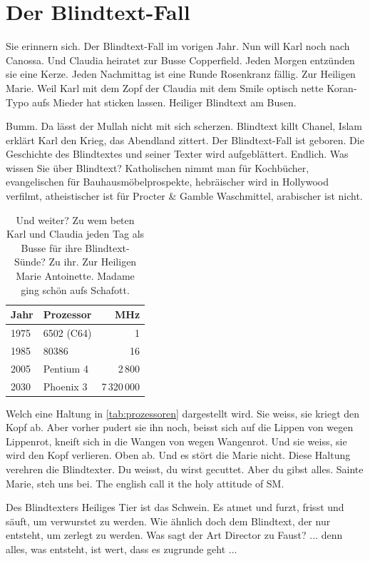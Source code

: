 \documentclass{scrartcl}
\begin{document}
  \section{Der Blindtext-Fall}

  Sie erinnern sich. Der Blindtext-Fall im vorigen Jahr. Nun will Karl noch nach Canossa. Und Claudia heiratet zur Busse Copperfield. Jeden Morgen entzünden sie eine Kerze. Jeden Nachmittag ist eine Runde Rosenkranz fällig. Zur Heiligen Marie. Weil Karl mit dem Zopf der Claudia mit dem Smile optisch nette Koran-Typo aufs Mieder hat sticken lassen. Heiliger Blindtext am Busen.

  Bumm. Da lässt der Mullah nicht mit sich scherzen. Blindtext killt Chanel, Islam erklärt Karl den Krieg, das Abendland zittert. Der Blindtext-Fall ist geboren. Die Geschichte des Blindtextes und seiner Texter wird aufgeblättert. Endlich. Was wissen Sie über Blindtext? Katholischen nimmt man für Kochbücher, evangelischen für Bauhausmöbelprospekte, hebräischer wird in Hollywood verfilmt, atheistischer ist für Procter \& Gamble Waschmittel, arabischer ist nicht.

  \begin{table}
    \centering
    \begin{tabular}{l|lr}
      \textbf{Jahr} & \textbf{Prozessor} & \textbf{MHz} \\ \hline
      1975 & 6502 (C64) & 1 \\
      1985 & 80386 & 16 \\
      2005 & Pentium 4 & 2\,800 \\
      2030 & Phoenix 3 & 7\,320\,000
    \end{tabular}
    \caption{Und weiter? Zu wem beten Karl und Claudia jeden Tag als Busse für ihre Blindtext-Sünde? Zu ihr. Zur Heiligen Marie Antoinette. Madame ging schön aufs Schafott.}
    \label{tab:prozessoren}
  \end{table}

  Welch eine Haltung in \autoref{tab:prozessoren} dargestellt wird. Sie weiss, sie kriegt den Kopf ab. Aber vorher pudert sie ihn noch, beisst sich auf die Lippen von wegen Lippenrot, kneift sich in die Wangen von wegen Wangenrot. Und sie weiss, sie wird den Kopf verlieren. Oben ab. Und es stört die Marie nicht. Diese Haltung verehren die Blindtexter. Du weisst, du wirst gecuttet. Aber du gibst alles. Sainte Marie, steh uns bei. The english call it the holy attitude of SM.

  Des Blindtexters Heiliges Tier ist das Schwein. Es atmet und furzt, frisst und säuft, um verwurstet zu werden. Wie ähnlich doch dem Blindtext, der nur entsteht, um zerlegt zu werden. Was sagt der Art Director zu Faust? ... denn alles, was entsteht, ist wert, dass es zugrunde geht ...
\end{document}
